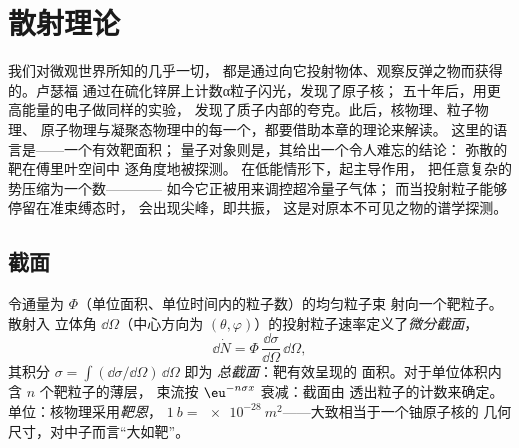 \chapter{散射理论}\label{ch:b3:scattering-theory}

我们对微观世界所知的几乎一切，
都是通过向它投射物体、观察反弹之物而获得的。卢瑟福
通过在硫化锌屏上计数α粒子闪光，发现了原子核；
五十年后，用更高能量的电子做同样的实验，
发现了质子内部的夸克。此后，核物理、粒子物理、
原子物理与凝聚态物理中的每一个，都要借助本章的理论来解读。
这里的语言是\emph{}——一个有效靶面积；
量子对象则是\emph{}，其给出一个令人难忘的结论：
弥散的靶在傅里叶空间中
逐角度地被探测。
在低能情形下，起主导作用，
把任意复杂的势压缩为一个数————
如今它正被用来调控超冷量子气体；
而当投射粒子能够停留在准束缚态时，
会出现尖峰，即共振，
这是对原本不可见之物的谱学探测。

\section{截面}

\begin{definition}[截面]\label{def:b3:scattering-theory:cross-section}
令通量为 $\Phi$（单位面积、单位时间内的粒子数）的均匀粒子束
射向一个靶粒子。散射入
立体角 $\dd\Omega$（中心方向为 $(\theta,
\varphi)$）的投射粒子速率定义了\emph{微分截面}，
\[
\dd\dot N = \Phi\,\frac{\dd\sigma}{\dd\Omega}\,\dd\Omega ,
\]
其积分 $\sigma = \int(\dd\sigma/\dd\Omega)\,\dd\Omega$ 即为
\emph{总截面}：靶有效呈现的
面积。对于单位体积内含 $n$ 个靶粒子的薄层，
束流按 $\eu^{-n\sigma x}$ 衰减：截面由
透出粒子的计数来确定。单位：核物理采用\emph{靶恩}，
$\qty{1}{b} = \qty{e-28}{m^2}$——大致相当于一个铀原子核的
几何尺寸，对中子而言“大如靶”。
\end{definition}

